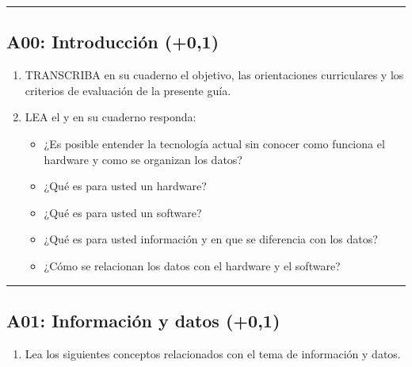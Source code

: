 \documentclass[letterpaper,10pt,spanish]{sphinxmanual}
\begin{document}
\bigskip\hrule\bigskip



\subsection{A00: Introducción (+0,1)}
\label{\detokenize{1_guias/10programacion/G1022:a00-introduccion-0-1}}
\sphinxAtStartPar
{}
\begin{enumerate}
%
\item {} 
\sphinxAtStartPar
TRANSCRIBA en su cuaderno el objetivo, las orientaciones curriculares y los criterios de evaluación de la presente guía.

\item {} 
\sphinxAtStartPar
LEA el  y en su cuaderno responda:
\begin{itemize}
\item {} 
\sphinxAtStartPar
¿Es posible entender la tecnología actual sin conocer como funciona el hardware y como se organizan los datos?

\item {} 
\sphinxAtStartPar
¿Qué es para usted un hardware?

\item {} 
\sphinxAtStartPar
¿Qué es para usted un software?

\item {} 
\sphinxAtStartPar
¿Qué es para usted información y en que se diferencia con los datos?

\item {} 
\sphinxAtStartPar
¿Cómo se relacionan los datos con el hardware y el software?

\end{itemize}

\end{enumerate}


\bigskip\hrule\bigskip



\subsection{A01: Información y datos (+0,1)}
\label{\detokenize{1_guias/10programacion/G1022:a01-informacion-y-datos-0-1}}
\sphinxAtStartPar
{}
\begin{enumerate}
%
\item {} 
\sphinxAtStartPar
Lea los siguientes conceptos relacionados con el tema de información y datos.

\end{enumerate}
\end{document}
